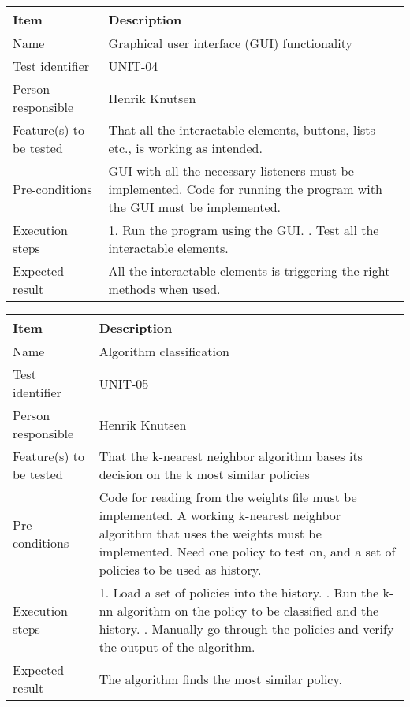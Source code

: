 		\begin{center}
			\begin{tabular}{ |  p{3.5cm} | p{10cm} | }
				\hline
				Item & Description \\ [5pt] \hline \hline
				Name & Graphical user interface (GUI) functionality \\  [5pt] \hline
				Test identifier & UNIT-04 \\  [5pt] \hline
				Person responsible & Henrik Knutsen \\  [5pt] \hline
				Feature(s) to be tested & That all the interactable elements, buttons, lists etc., is working as intended. \\  [5pt] \hline
				Pre-conditions & GUI with all the necessary listeners must be implemented. Code for running the program with the GUI must be implemented. \\  [5pt] \hline
				Execution steps & 1. Run the program using the GUI. \newline 2. Test all the interactable elements. \\  [5pt] \hline
				Expected result & All the interactable elements is triggering the right methods when used. \\  [5pt] \hline
			\end{tabular}
		\end{center}

		\begin{center}
			\begin{tabular}{ |  p{3.5cm} | p{10cm} | }
				\hline
				Item & Description \\ [5pt] \hline \hline
				Name & Algorithm classification \\  [5pt] \hline
				Test identifier & UNIT-05 \\  [5pt] \hline
				Person responsible & Henrik Knutsen \\  [5pt] \hline
				Feature(s) to be tested & That the k-nearest neighbor algorithm bases its decision on the k most similar policies \\  [5pt] \hline
				Pre-conditions & Code for reading from the weights file must be implemented. A working k-nearest neighbor algorithm that uses the weights must be implemented. Need one policy to test on, and a set of policies to be used as history. \\  [5pt] \hline
				Execution steps & 1. Load a set of policies into the history. \newline 2. Run the k-nn algorithm on the policy to be classified and the history. \newline 3. Manually go through the policies and verify the output of the algorithm. \\  [5pt] \hline
				Expected result & The algorithm finds the most similar policy. \\  [5pt] \hline
			\end{tabular}
		\end{center}

